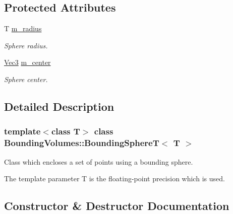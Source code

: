 \subsection*{Protected Attributes}
\begin{DoxyCompactItemize}
\item 
\mbox{\label{classBoundingVolumes_1_1BoundingSphereT_adb424c867ed93cf5fdb62afe07a96a05}} 
T \hyperlink{classBoundingVolumes_1_1BoundingSphereT_adb424c867ed93cf5fdb62afe07a96a05}{m\+\_\+radius}
\begin{DoxyCompactList}\small\item\em Sphere radius. \end{DoxyCompactList}\item 
\mbox{\label{classBoundingVolumes_1_1BoundingSphereT_ad65d5be68c4028651d959dc8b88fe944}} 
\hyperlink{classBoundingVolumes_1_1BoundingSphereT_ad89ed315255abcde216e9ca1de3068ab}{Vec3} \hyperlink{classBoundingVolumes_1_1BoundingSphereT_ad65d5be68c4028651d959dc8b88fe944}{m\+\_\+center}
\begin{DoxyCompactList}\small\item\em Sphere center. \end{DoxyCompactList}\end{DoxyCompactItemize}


\subsection{Detailed Description}
\subsubsection*{template$<$class T$>$\newline
class Bounding\+Volumes\+::\+Bounding\+Sphere\+T$<$ T $>$}

Class which encloses a set of points using a bounding sphere. 

The template parameter T is the floating-\/point precision which is used. 

\subsection{Constructor \& Destructor Documentation}
\mbox{\label{classBoundingVolumes_1_1BoundingSphereT_a9e81ed0ce76489225f5dbd57ed1abc8f}} 
